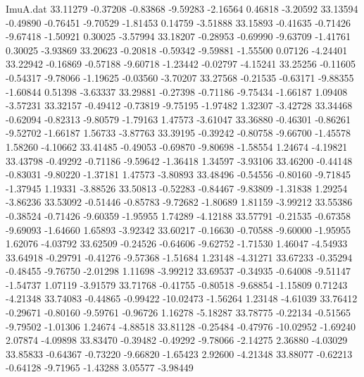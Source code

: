 \begin{filecontents}{ImuA.dat}
  33.11279   -0.37208   -0.83868   -9.59283   -2.16564    0.46818   -3.20592
  33.13594   -0.49890   -0.76451   -9.70529   -1.81453    0.14759   -3.51888
  33.15893   -0.41635   -0.71426   -9.67418   -1.50921    0.30025   -3.57994
  33.18207   -0.28953   -0.69990   -9.63709   -1.41761    0.30025   -3.93869
  33.20623   -0.20818   -0.59342   -9.59881   -1.55500    0.07126   -4.24401
  33.22942   -0.16869   -0.57188   -9.60718   -1.23442   -0.02797   -4.15241
  33.25256   -0.11605   -0.54317   -9.78066   -1.19625   -0.03560   -3.70207
  33.27568   -0.21535   -0.63171   -9.88355   -1.60844    0.51398   -3.63337
  33.29881   -0.27398   -0.71186   -9.75434   -1.66187    1.09408   -3.57231
  33.32157   -0.49412   -0.73819   -9.75195   -1.97482    1.32307   -3.42728
  33.34468   -0.62094   -0.82313   -9.80579   -1.79163    1.47573   -3.61047
  33.36880   -0.46301   -0.86261   -9.52702   -1.66187    1.56733   -3.87763
  33.39195   -0.39242   -0.80758   -9.66700   -1.45578    1.58260   -4.10662
  33.41485   -0.49053   -0.69870   -9.80698   -1.58554    1.24674   -4.19821
  33.43798   -0.49292   -0.71186   -9.59642   -1.36418    1.34597   -3.93106
  33.46200   -0.44148   -0.83031   -9.80220   -1.37181    1.47573   -3.80893
  33.48496   -0.54556   -0.80160   -9.71845   -1.37945    1.19331   -3.88526
  33.50813   -0.52283   -0.84467   -9.83809   -1.31838    1.29254   -3.86236
  33.53092   -0.51446   -0.85783   -9.72682   -1.80689    1.81159   -3.99212
  33.55386   -0.38524   -0.71426   -9.60359   -1.95955    1.74289   -4.12188
  33.57791   -0.21535   -0.67358   -9.69093   -1.64660    1.65893   -3.92342
  33.60217   -0.16630   -0.70588   -9.60000   -1.95955    1.62076   -4.03792
  33.62509   -0.24526   -0.64606   -9.62752   -1.71530    1.46047   -4.54933
  33.64918   -0.29791   -0.41276   -9.57368   -1.51684    1.23148   -4.31271
  33.67233   -0.35294   -0.48455   -9.76750   -2.01298    1.11698   -3.99212
  33.69537   -0.34935   -0.64008   -9.51147   -1.54737    1.07119   -3.91579
  33.71768   -0.41755   -0.80518   -9.68854   -1.15809    0.71243   -4.21348
  33.74083   -0.44865   -0.99422  -10.02473   -1.56264    1.23148   -4.61039
  33.76412   -0.29671   -0.80160   -9.59761   -0.96726    1.16278   -5.18287
  33.78775   -0.22134   -0.51565   -9.79502   -1.01306    1.24674   -4.88518
  33.81128   -0.25484   -0.47976  -10.02952   -1.69240    2.07874   -4.09898
  33.83470   -0.39482   -0.49292   -9.78066   -2.14275    2.36880   -4.03029
  33.85833   -0.64367   -0.73220   -9.66820   -1.65423    2.92600   -4.21348
  33.88077   -0.62213   -0.64128   -9.71965   -1.43288    3.05577   -3.98449

\end{filecontents}
